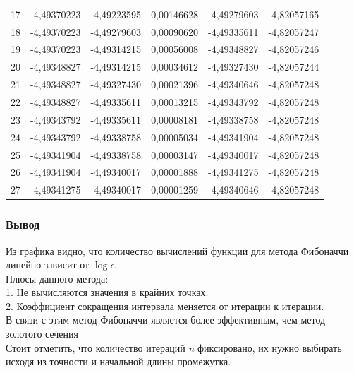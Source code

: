 \begin{center}
\begin{tabular}{ | l | l | l | l | l | l |}
        17            & -4,49370223 & -4,49223595 & 0,00146628 & -4,49279603 & -4,82057165 \\
        18            & -4,49370223 & -4,49279603 & 0,00090620 & -4,49335611 & -4,82057247 \\
        19            & -4,49370223 & -4,49314215 & 0,00056008 & -4,49348827 & -4,82057246 \\
        20            & -4,49348827 & -4,49314215 & 0,00034612 & -4,49327430 & -4,82057244 \\
        21            & -4,49348827 & -4,49327430 & 0,00021396 & -4,49340646 & -4,82057248 \\
        22            & -4,49348827 & -4,49335611 & 0,00013215 & -4,49343792 & -4,82057248 \\
        23            & -4,49343792 & -4,49335611 & 0,00008181 & -4,49338758 & -4,82057248 \\
        24            & -4,49343792 & -4,49338758 & 0,00005034 & -4,49341904 & -4,82057248 \\
        25            & -4,49341904 & -4,49338758 & 0,00003147 & -4,49340017 & -4,82057248 \\
        26            & -4,49341904 & -4,49340017 & 0,00001888 & -4,49341275 & -4,82057248 \\
        27            & -4,49341275 & -4,49340017 & 0,00001259 & -4,49340646 & -4,82057248 \\ \hline
    \end{tabular}
\end{center}

\subsubsection{Вывод}
{Из графика  видно, что количество вычислений функции для метода Фибоначчи линейно зависит от $\log\epsilon$. \\

Плюсы данного метода: \\
1. Не вычисляются значения в крайних точках. \\
2. Коэффициент сокращения интервала меняется от итерации к итерации. \\

В связи с этим метод Фибоначчи является более эффективным, чем метод золотого сечения\\
Стоит отметить, что количество итераций \textit{n} фиксировано, их нужно выбирать исходя из точности и начальной длины промежутка.}


